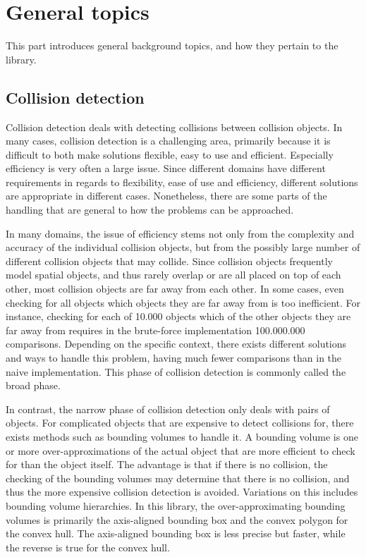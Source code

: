 
\section{General topics}

This part introduces general background topics, and how they
pertain to the library.

\subsection{Collision detection}

Collision detection deals with detecting collisions between
collision objects. In many cases, collision detection is a
challenging area, primarily because it is difficult to both
make solutions flexible, easy to use and efficient.
Especially efficiency is very often a large issue.
Since different domains have different requirements in regards
to flexibility, ease of use and efficiency, different solutions
are appropriate in different cases. Nonetheless, there are
some parts of the handling that are general to how the problems
can be approached.

In many domains, the issue of efficiency stems not only from the
complexity and accuracy of the individual collision objects,
but from the possibly large number of different collision objects that may
collide. Since collision objects frequently model spatial objects,
and thus rarely overlap or are all placed on top of each other,
most collision objects are far away from each other.
In some cases, even checking for all objects which objects they
are far away from is too inefficient. For instance, checking
for each of 10.000 objects which of the other objects they are
far away from requires in the brute-force implementation 100.000.000 comparisons.
Depending on the specific context, there exists different
solutions and ways to handle this problem,
having much fewer comparisons than in the naive implementation.
This phase of collision detection is commonly called the broad
phase.

In contrast, the narrow phase of collision detection only deals
with pairs of objects. For complicated objects that are expensive
to detect collisions for, there exists methods such as bounding
volumes to handle it. A bounding volume is one or more over-approximations
of the actual object that are more efficient to check for than the
object itself. The advantage is that if there is no collision,
the checking of the bounding volumes may determine that there is
no collision, and thus the more expensive collision detection is avoided.
Variations on this includes bounding volume hierarchies.
In this library, the over-approximating bounding volumes is primarily
the axis-aligned bounding box and the convex polygon for the convex hull.
The axis-aligned bounding box is less precise but faster, while the
reverse is true for the convex hull.

